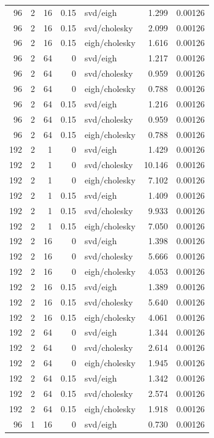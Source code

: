 \begin{tabular}{rrrrlrr}
96 & 2 & 16 & 0.15 & svd/eigh & 1.299 & 0.00126 \\
96 & 2 & 16 & 0.15 & svd/cholesky & 2.099 & 0.00126 \\
96 & 2 & 16 & 0.15 & eigh/cholesky & 1.616 & 0.00126 \\
96 & 2 & 64 & 0 & svd/eigh & 1.217 & 0.00126 \\
96 & 2 & 64 & 0 & svd/cholesky & 0.959 & 0.00126 \\
96 & 2 & 64 & 0 & eigh/cholesky & 0.788 & 0.00126 \\
96 & 2 & 64 & 0.15 & svd/eigh & 1.216 & 0.00126 \\
96 & 2 & 64 & 0.15 & svd/cholesky & 0.959 & 0.00126 \\
96 & 2 & 64 & 0.15 & eigh/cholesky & 0.788 & 0.00126 \\
192 & 2 & 1 & 0 & svd/eigh & 1.429 & 0.00126 \\
192 & 2 & 1 & 0 & svd/cholesky & 10.146 & 0.00126 \\
192 & 2 & 1 & 0 & eigh/cholesky & 7.102 & 0.00126 \\
192 & 2 & 1 & 0.15 & svd/eigh & 1.409 & 0.00126 \\
192 & 2 & 1 & 0.15 & svd/cholesky & 9.933 & 0.00126 \\
192 & 2 & 1 & 0.15 & eigh/cholesky & 7.050 & 0.00126 \\
192 & 2 & 16 & 0 & svd/eigh & 1.398 & 0.00126 \\
192 & 2 & 16 & 0 & svd/cholesky & 5.666 & 0.00126 \\
192 & 2 & 16 & 0 & eigh/cholesky & 4.053 & 0.00126 \\
192 & 2 & 16 & 0.15 & svd/eigh & 1.389 & 0.00126 \\
192 & 2 & 16 & 0.15 & svd/cholesky & 5.640 & 0.00126 \\
192 & 2 & 16 & 0.15 & eigh/cholesky & 4.061 & 0.00126 \\
192 & 2 & 64 & 0 & svd/eigh & 1.344 & 0.00126 \\
192 & 2 & 64 & 0 & svd/cholesky & 2.614 & 0.00126 \\
192 & 2 & 64 & 0 & eigh/cholesky & 1.945 & 0.00126 \\
192 & 2 & 64 & 0.15 & svd/eigh & 1.342 & 0.00126 \\
192 & 2 & 64 & 0.15 & svd/cholesky & 2.574 & 0.00126 \\
192 & 2 & 64 & 0.15 & eigh/cholesky & 1.918 & 0.00126 \\
96 & 1 & 16 & 0 & svd/eigh & 0.730 & 0.00126 \\

\end{tabular}
